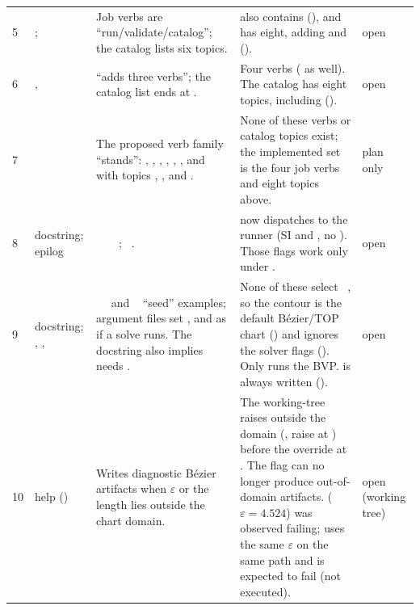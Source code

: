 {\begin{longtable}{P{0.4cm}P{3.4cm}P{4.4cm}P{5.1cm}P{1.6cm}}
5 & ;  & Job verbs are ``run/validate/catalog''; the catalog lists six topics. &  also contains  (), and  has eight, adding  and  (). & open \\
6 & ,  &  ``adds three verbs''; the catalog list ends at . & Four verbs ( as well). The catalog has eight topics, including  (). & open \\
7 &  & The proposed verb family ``stands'': , , , , , , and  with topics , ,  and . & None of these verbs or catalog topics exist; the implemented set is the four job verbs and eight topics above. & plan only \\
8 &  docstring;  epilog & ~~~~; ~. &  now dispatches to the runner (SI  and , no ). Those flags work only under . & open \\
9 &  docstring; , ,  & ~~ and ~ ``seed'' examples; argument files set ,  and  as if a solve runs. The docstring also implies  needs . & None of these select ~, so the contour is the default B\'ezier/TOP chart () and  ignores the solver flags (). Only  runs the BVP.  is always written (). & open \\
10 &  help () & Writes diagnostic B\'ezier artifacts when $\varepsilon$ or the length lies outside the chart domain. & The working-tree  raises  outside the domain (, raise at ) before the override at . The flag can no longer produce out-of-domain artifacts.  ($\varepsilon=4.524$) was observed failing;  uses the same $\varepsilon$ on the same path and is expected to fail (not executed). & open (working tree) \\

\end{longtable}}
